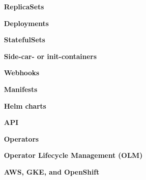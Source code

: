 \textbf{ReplicaSets}

\textbf{Deployments}

\textbf{StatefulSets}

\textbf{Side-car- or init-containers}

\textbf{Webhooks}

\textbf{Manifests}

\textbf{Helm charts}

\textbf{API}

\textbf{Operators}

\textbf{Operator Lifecycle Management (OLM)}

\textbf{AWS, GKE, and OpenShift}